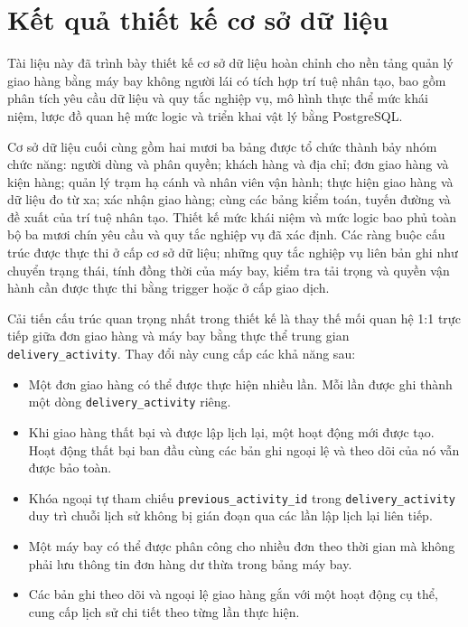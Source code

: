 
\section{Kết quả thiết kế cơ sở dữ liệu}\label{s:results}

\qquad Tài liệu này đã trình bày thiết kế cơ sở dữ liệu hoàn chỉnh cho nền tảng quản lý giao hàng bằng máy bay không người lái có tích hợp trí tuệ nhân tạo, bao gồm phân tích yêu cầu dữ liệu và quy tắc nghiệp vụ, mô hình thực thể mức khái niệm, lược đồ quan hệ mức logic và triển khai vật lý bằng PostgreSQL.

Cơ sở dữ liệu cuối cùng gồm hai mươi ba bảng được tổ chức thành bảy nhóm chức năng: người dùng và phân quyền; khách hàng và địa chỉ; đơn giao hàng và kiện hàng; quản lý trạm hạ cánh và nhân viên vận hành; thực hiện giao hàng và dữ liệu đo từ xa; xác nhận giao hàng; cùng các bảng kiểm toán, tuyến đường và đề xuất của trí tuệ nhân tạo. Thiết kế mức khái niệm và mức logic bao phủ toàn bộ ba mươi chín yêu cầu và quy tắc nghiệp vụ đã xác định. Các ràng buộc cấu trúc được thực thi ở cấp cơ sở dữ liệu; những quy tắc nghiệp vụ liên bản ghi như chuyển trạng thái, tính đồng thời của máy bay, kiểm tra tải trọng và quyền vận hành cần được thực thi bằng trigger hoặc ở cấp giao dịch.

Cải tiến cấu trúc quan trọng nhất trong thiết kế là thay thế mối quan hệ 1:1 trực tiếp giữa đơn giao hàng và máy bay bằng thực thể trung gian \texttt{delivery\_activity}. Thay đổi này cung cấp các khả năng sau:

\begin{itemize}
    \item Một đơn giao hàng có thể được thực hiện nhiều lần. Mỗi lần được ghi thành một dòng \texttt{delivery\_activity} riêng.
    \item Khi giao hàng thất bại và được lập lịch lại, một hoạt động mới được tạo. Hoạt động thất bại ban đầu cùng các bản ghi ngoại lệ và theo dõi của nó vẫn được bảo toàn.
    \item Khóa ngoại tự tham chiếu \texttt{previous\_activity\_id} trong \texttt{delivery\_activity} duy trì chuỗi lịch sử không bị gián đoạn qua các lần lập lịch lại liên tiếp.
    \item Một máy bay có thể được phân công cho nhiều đơn theo thời gian mà không phải lưu thông tin đơn hàng dư thừa trong bảng máy bay.
    \item Các bản ghi theo dõi và ngoại lệ giao hàng gắn với một hoạt động cụ thể, cung cấp lịch sử chi tiết theo từng lần thực hiện.
\end{itemize}
